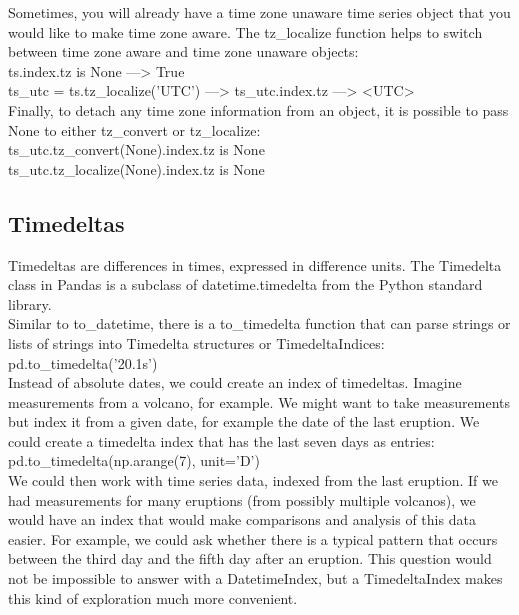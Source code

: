 \documentclass{article}
\numberwithin{equation}{section} %
\begin{document}
Sometimes, you will already have a time zone unaware time series object that you
would like to make time zone aware. The tz\_localize function helps to switch
between time zone aware and time zone unaware objects: \\

ts.index.tz is None ---> True \\

ts\_utc = ts.tz\_localize('UTC') ---> ts\_utc.index.tz ---> <UTC> \\

Finally, to detach any time zone information from an object, it is possible to pass
None to either tz\_convert or tz\_localize: \\

ts\_utc.tz\_convert(None).index.tz is None \\

ts\_utc.tz\_localize(None).index.tz is None

\subsection*{Timedeltas}

Timedeltas are differences in times, expressed in difference units. The Timedelta
class in Pandas is a subclass of datetime.timedelta from the Python standard
library. \\

Similar to to\_datetime, there is a to\_timedelta function that can parse strings or
lists of strings into Timedelta structures or TimedeltaIndices: \\

pd.to\_timedelta('20.1s') \\

Instead of absolute dates, we could create an index of timedeltas. Imagine measurements from a volcano, for example. We might want to take measurements but index it from a given date, for example the date of the last eruption. We could
create a timedelta index that has the last seven days as entries: \\

pd.to\_timedelta(np.arange(7), unit='D') \\

We could then work with time series data, indexed from the last eruption. If we
had measurements for many eruptions (from possibly multiple volcanos), we would
have an index that would make comparisons and analysis of this data easier. For
example, we could ask whether there is a typical pattern that occurs between the
third day and the fifth day after an eruption. This question would not be impossible
to answer with a DatetimeIndex, but a TimedeltaIndex makes this kind of
exploration much more convenient. \\
\end{document}
